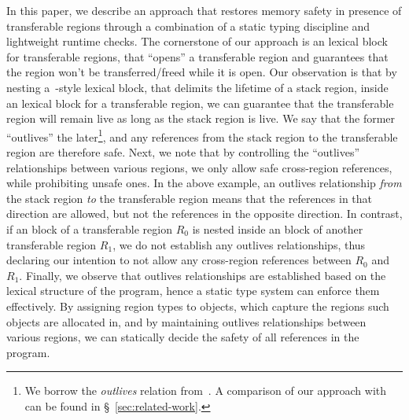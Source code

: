 In this paper, we describe an approach that restores memory safety in
presence of transferable regions through a combination of a static
typing discipline and lightweight runtime checks. The cornerstone of
our approach is an  lexical block for transferable regions,
that ``opens'' a transferable region and guarantees that the region
won't be transferred/freed while it is open. Our observation is that
by nesting a~\cite{tofte94}-style  lexical block, that
delimits the lifetime of a stack region, inside an  lexical
block for a transferable region, we can guarantee that the
transferable region will remain live as long as the stack region is
live. We say that the former ``outlives'' the later\footnote{We borrow
the \emph{outlives} relation from~\cite{MIT03}. A comparison of our
approach with~\cite{MIT03} can be found in
\S~\ref{sec:related-work}.}, and any references from the stack region
to the transferable region are therefore safe. 
Next, we note that by controlling the ``outlives'' relationships
between various regions, we only allow safe cross-region references,
while prohibiting unsafe ones. In the above example, an outlives
relationship \emph{from} the stack region \emph{to} the transferable
region means that the references in that direction are allowed, but
not the references in the opposite direction. In contrast, if an
 block of a transferable region $R_0$ is nested inside an
 block of another transferable region $R_1$, we do not
establish any outlives relationships, thus declaring our intention to
not allow any cross-region references between $R_0$ and $R_1$.
Finally, we observe that outlives relationships are established based
on the lexical structure of the program, hence a static type system
can enforce them effectively. By assigning region types to objects,
which capture the regions such objects are allocated in, and by
maintaining outlives relationships between various regions, we can
statically decide the safety of all references in the program.

